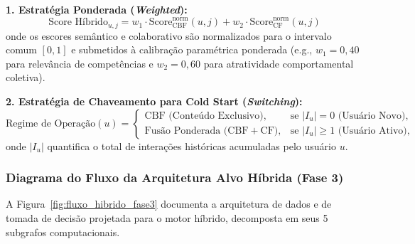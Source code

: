 \begin{tcolorbox}[burkebox, title={Concepção Matemática da Filtragem Híbrida}]
\textbf{1. Estratégia Ponderada (\textit{Weighted}):}
\begin{equation}
    \text{Score Híbrido}_{u,j} = w_1 \cdot \text{Score}_{\text{CBF}}^{\text{norm}}(u, j) + w_2 \cdot \text{Score}_{\text{CF}}^{\text{norm}}(u, j)
\end{equation}
onde os escores semântico e colaborativo são normalizados para o intervalo comum $[0, 1]$ e submetidos à calibração paramétrica ponderada (e.g., $w_1 = 0{,}40$ para relevância de competências e $w_2 = 0{,}60$ para atratividade comportamental coletiva).

\vspace{0.25cm}
\textbf{2. Estratégia de Chaveamento para Cold Start (\textit{Switching}):}
\begin{equation}
    \text{Regime de Operação}(u) = 
    \begin{cases} 
        \text{CBF (Conteúdo Exclusivo)}, & \text{se } |I_u| = 0 \text{ (Usuário Novo)}, \\
        \text{Fusão Ponderada (CBF} + \text{CF)}, & \text{se } |I_u| \ge 1 \text{ (Usuário Ativo)},
    \end{cases}
\end{equation}
onde $|I_u|$ quantifica o total de interações históricas acumuladas pelo usuário $u$.
\end{tcolorbox}

\subsubsection{Diagrama do Fluxo da Arquitetura Alvo Híbrida (Fase 3)}

A Figura~\ref{fig:fluxo_hibrido_fase3} documenta a arquitetura de dados e de tomada de decisão projetada para o motor híbrido, decomposta em seus 5 subgrafos computacionais.

